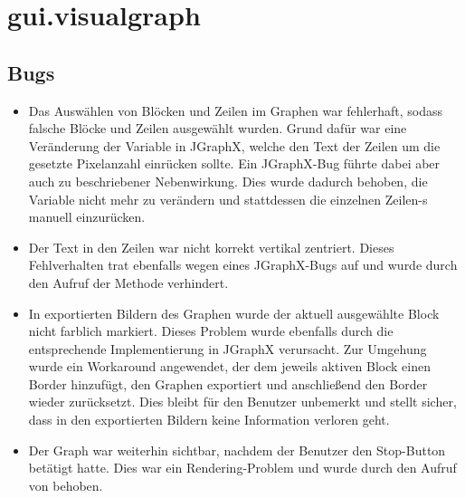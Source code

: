 \section{gui.visualgraph}

\subsection{Bugs}

\begin{itemize}
  \item Das Auswählen von Blöcken und Zeilen im Graphen war fehlerhaft, sodass falsche Blöcke und Zeilen ausgewählt wurden.
        Grund dafür war eine Veränderung der Variable  in JGraphX, welche den Text der Zeilen um die gesetzte Pixelanzahl einrücken sollte.
        Ein JGraphX-Bug führte dabei aber auch zu beschriebener Nebenwirkung.
        Dies wurde dadurch behoben, die Variable nicht mehr zu verändern und stattdessen die einzelnen Zeilen-s manuell einzurücken.
  \item Der Text in den Zeilen war nicht korrekt vertikal zentriert.
        Dieses Fehlverhalten trat ebenfalls wegen eines JGraphX-Bugs auf und wurde durch den Aufruf der Methode  verhindert.
  \item In exportierten Bildern des Graphen wurde der aktuell ausgewählte Block nicht farblich markiert.
        Dieses Problem wurde ebenfalls durch die entsprechende Implementierung in JGraphX verursacht.
        Zur Umgehung wurde ein Workaround angewendet, der dem jeweils aktiven Block einen Border hinzufügt, den Graphen exportiert und anschließend den Border wieder zurücksetzt.
        Dies bleibt für den Benutzer unbemerkt und stellt sicher, dass in den exportierten Bildern keine Information verloren geht.
  \item Der Graph war weiterhin sichtbar, nachdem der Benutzer den Stop-Button betätigt hatte.
        Dies war ein Rendering-Problem und wurde durch den Aufruf von  behoben.
\end{itemize}

